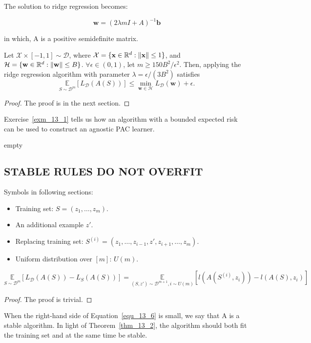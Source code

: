 The solution to ridge regression becomes:

\begin{equation}
	\mathbf{w} = {(2\lambda m I + A)}^{-1} \mathbf{b}
\end{equation}

in which, A is a positive semidefinite matrix.

\begin{thm}
	\label{thm_13_1}
	Let $ \mathcal{X}\times [-1,1] \sim \mathcal{D} $, 
	where $ \mathcal{X} = \{ \mathbf{x} \in \mathbb{R}^d : \Arrowvert \mathbf{x} \Arrowvert \le 1 \} $, 
	and $ \mathcal{H} = \{ \mathbf{w} \in \mathbb{R}^d : \Arrowvert \mathbf{w} \Arrowvert \le B \} $.
	$ \forall \epsilon \in (0,1) $, let $ m \ge 150B^2/\epsilon^2 $. Then, applying the ridge regression algorithm
	with parameter $ \lambda = \epsilon/(3B^2) $ satisfies
	\[ \underset{S\sim\mathcal{D}^m} {\mathbb{E}} [L_\mathcal{D}(A(S))] 
	\le \min\limits_{\mathbf{w}\in\mathcal{H}}L_\mathcal{D}(\mathbf{w}) + \epsilon.\]
	\begin{proof}
		The proof is in the next section.
	\end{proof}
\end{thm}

Exercise~\ref{exm_13_1} tells us how an algorithm with a bounded expected risk can be used to construct an agnostic PAC learner.
\begin{exm}
	\label{exm_13_1}
	empty
\end{exm}

\subsection{STABLE RULES DO NOT OVERFIT}

Symbols in following sections:
\begin{itemize}
	\item Training set: $ S = (z_1, \dots, z_m) $.
	\item An additional example $ z' $.
	\item Replacing training set: $ S^{(i)} = (z_1, \dots, z_{i-1}, z', z_{i+1}, \dots, z_m) $.
	\item Uniform distribution over $ [m] $: $ U(m) $.
\end{itemize}

\begin{thm}
	\label{thm_13_2}
	\begin{equation}
		\label{equ_13_6}
		\underset{S \sim \mathcal{D}^m} {\mathbb{E}}
		[L_{\mathcal{D}}(A(S)) - L_S(A(S))]
		= \underset{(S,z') \sim \mathcal{D}^{m+1}, i \sim U(m)} {\mathbb{E}}
		[l(A(S^{(i)}, z_i)) - l(A(S), z_i)]
	\end{equation}	
	\begin{proof}
		The proof is trivial.
	\end{proof}
\end{thm}
When the right-hand side of Equation~\ref{equ_13_6} is small, we say that A is a stable algorithm.
In light of Theorem~\ref{thm_13_2}, the algorithm should both fit the training set and at the same time be stable.

